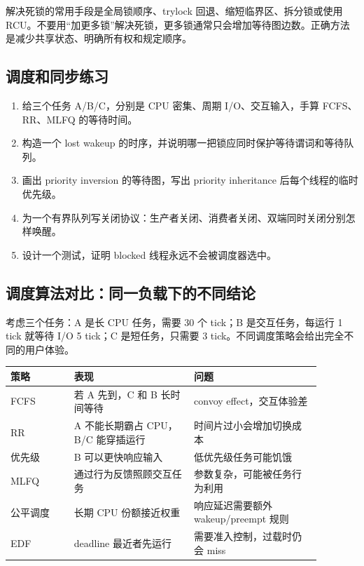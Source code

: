 解决死锁的常用手段是全局锁顺序、trylock 回退、缩短临界区、拆分锁或使用 RCU。不要用“加更多锁”解决死锁，更多锁通常只会增加等待图边数。正确方法是减少共享状态、明确所有权和规定顺序。

\subsection{调度和同步练习}

\begin{enumerate}
\tightlist
\item 给三个任务 A/B/C，分别是 CPU 密集、周期 I/O、交互输入，手算 FCFS、RR、MLFQ 的等待时间。
\item 构造一个 lost wakeup 的时序，并说明哪一把锁应同时保护等待谓词和等待队列。
\item 画出 priority inversion 的等待图，写出 priority inheritance 后每个线程的临时优先级。
\item 为一个有界队列写关闭协议：生产者关闭、消费者关闭、双端同时关闭分别怎样唤醒。
\item 设计一个测试，证明 blocked 线程永远不会被调度器选中。
\end{enumerate}

\subsection{调度算法对比：同一负载下的不同结论}

考虑三个任务：A 是长 CPU 任务，需要 30 个 tick；B 是交互任务，每运行 1 tick 就等待 I/O 5 tick；C 是短任务，只需要 3 tick。不同调度策略会给出完全不同的用户体验。

\begin{longtable}{|p{0.18\linewidth}|p{0.34\linewidth}|p{0.36\linewidth}|}
\toprule
策略 & 表现 & 问题 \\
\midrule
FCFS & 若 A 先到，C 和 B 长时间等待 & convoy effect，交互体验差 \\\tablerowrule
RR & A 不能长期霸占 CPU，B/C 能穿插运行 & 时间片过小会增加切换成本 \\\tablerowrule
优先级 & B 可以更快响应输入 & 低优先级任务可能饥饿 \\\tablerowrule
MLFQ & 通过行为反馈照顾交互任务 & 参数复杂，可能被任务行为利用 \\\tablerowrule
公平调度 & 长期 CPU 份额接近权重 & 响应延迟需要额外 wakeup/preempt 规则 \\\tablerowrule
EDF & deadline 最近者先运行 & 需要准入控制，过载时仍会 miss \\
\bottomrule
\end{longtable}

